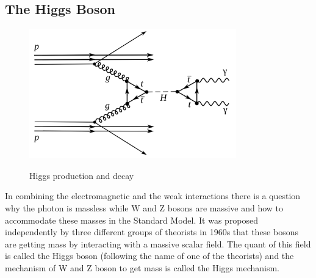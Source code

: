 \subsection{The Higgs Boson}
\label{Intro_Higgs}


\begin{figure}[htb]
  \begin{center}
    {\includegraphics[width=0.80\textwidth]{../figs/Intro/higgsProduction.png}}
    \caption{Higgs production and decay}
    \label{fig:higgsProduction}
  \end{center}
\end{figure}


In combining the electromagnetic and the weak interactions there is a question why the photon is massless while W and Z bosons are massive and how to accommodate these masses in the Standard Model. It was proposed independently by three different groups of theorists in 1960s that these bosons are getting mass by interacting with a massive scalar field. The quant of this field is called the Higgs boson (following the name of one of the theorists) and the mechanism of W and Z boson to get mass is called the Higgs mechanism. 

